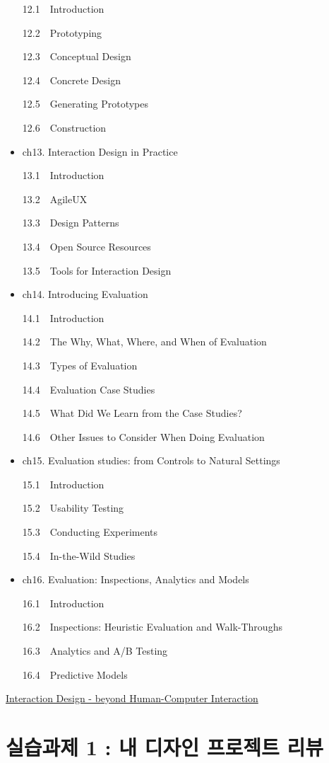 \documentclass[
  letterpaper,
]{book}
\begin{document}
\begin{itemize}
  12.1 Introduction

  12.2 Prototyping

  12.3 Conceptual Design

  12.4 Concrete Design

  12.5 Generating Prototypes

  12.6 Construction
\item
  ch13. Interaction Design in Practice

  13.1 Introduction

  13.2 AgileUX

  13.3 Design Patterns

  13.4 Open Source Resources

  13.5 Tools for Interaction Design
\item
  ch14. Introducing Evaluation

  14.1 Introduction

  14.2 The Why, What, Where, and When of Evaluation

  14.3 Types of Evaluation

  14.4 Evaluation Case Studies

  14.5 What Did We Learn from the Case Studies?

  14.6 Other Issues to Consider When Doing Evaluation
\item
  ch15. Evaluation studies: from Controls to Natural Settings

  15.1 Introduction

  15.2 Usability Testing

  15.3 Conducting Experiments

  15.4 In-the-Wild Studies
\item
  ch16. Evaluation: Inspections, Analytics and Models

  16.1 Introduction

  16.2 Inspections: Heuristic Evaluation and Walk-Throughs

  16.3 Analytics and A/B Testing

  16.4 Predictive Models
\end{itemize}

\href{http://id-book.com}{Interaction Design - beyond Human-Computer
Interaction}

\section{실습과제 1 : 내 디자인 프로젝트
리뷰}\label{uxc2e4uxc2b5uxacfcuxc81c-1-uxb0b4-uxb514uxc790uxc778-uxd504uxb85cuxc81duxd2b8-uxb9acuxbdf0}
\end{document}
